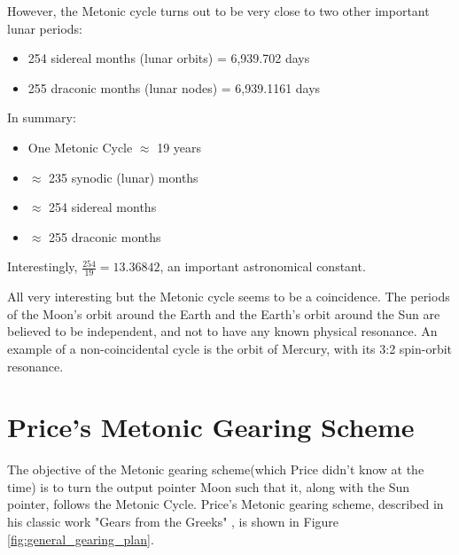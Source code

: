 \documentclass[11pt, oneside]{article}   	%
\theoremstyle{definition}
\begin{document}
\bigskip
\noindent
However, the Metonic cycle turns out to be very close to two other important lunar periods:

\begin{itemize}
\item 254 sidereal months (lunar orbits) = 6,939.702 days
\item 255 draconic months (lunar nodes) = 6,939.1161 days
\end{itemize}

\bigskip
\noindent
In summary: 

\begin{itemize}
\item One Metonic Cycle $\approx$ 19 years 
\item $\approx$ 235 synodic (lunar) months
\item $\approx$ 254 sidereal months
\item $\approx$ 255 draconic months
\end{itemize}

\bigskip
\noindent
Interestingly, $\frac{254}{19} = 13.36842$, an important astronomical constant. 

\bigskip
\noindent
All very interesting but the Metonic cycle seems to be a coincidence. The periods of the Moon's orbit around the Earth and the Earth's 
orbit around the Sun are believed to be independent, and not to have any known physical resonance. An example of a non-coincidental 
cycle is the orbit of Mercury, with its 3:2 spin-orbit resonance.

\section{Price's Metonic Gearing Scheme}
The objective of the Metonic gearing scheme(which Price didn't know at the time) is to turn the output pointer Moon such that it, along with the Sun pointer, follows the Metonic Cycle.
Price's Metonic gearing scheme, described in his classic work "Gears from the Greeks" \cite{gears_from_the_greeks}, is shown in Figure \ref{fig:general_gearing_plan}. 
\end{document}
